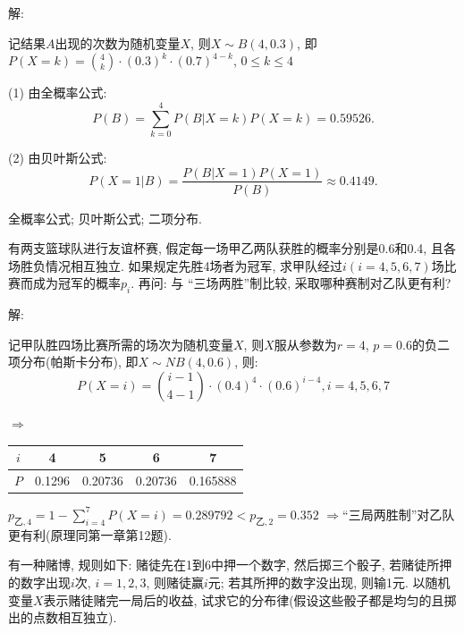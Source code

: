 \documentclass[standard]{ExBook}
\begin{document}
\begin{qitems}
    \begin{bbox}
解: 

记结果$A$出现的次数为随机变量$X$, 则$X\sim B(4,0.3)$, 即$P(X=k)=\binom{4}{k}\cdot(0.3)^k\cdot(0.7)^{4-k}$, $0 \leq k \leq 4$

(1) 由全概率公式:
$$P(B)=\sum\limits_{k=0}^{4}P(B|X=k)P(X=k)=0.59526.$$

(2) 由贝叶斯公式:
$$P(X=1|B)=\frac{P(B|X=1)P(X=1)}{P(B)}\approx0.4149.$$

\textcolor{themeColor}{\selectfont {} 全概率公式; 贝叶斯公式; 二项分布.}
    \end{bbox}

\vspace{-5em}

    \begin{bbox}
    \begin{shaded}
        \qitem
有两支篮球队进行友谊杯赛, 假定每一场甲乙两队获胜的概率分别是0.6和0.4, 且各场胜负情况相互独立. 如果规定先胜4场者为冠军, 求甲队经过$i(i=4,5,6,7)$场比赛而成为冠军的概率$p_{i}$. 再问: 与 ``三场两胜''制比较, 采取哪种赛制对乙队更有利?
    \end{shaded}
    \end{bbox}

\vspace{-5em}

    \begin{bbox}
解: 

记甲队胜四场比赛所需的场次为随机变量$X$, 则$X$服从参数为$r=4$, $p=0.6$的负二项分布(帕斯卡分布), 即$X\sim NB(4,0.6)$, 则:
$$P(X=i)=\binom{i-1}{4-1}\cdot(0.4)^{4}\cdot(0.6)^{i-4},i=4,5,6,7$$
\begin{center}
    $\Longrightarrow$
\begin{tabular}{c|c|c|c|c}
    \hline
    $i$ & 4 & 5 & 6 & 7 \\
    \hline
    $P$ & 0.1296 & 0.20736 & 0.20736 & 0.165888\\
    \hline
\end{tabular}
\end{center}
$p_{\text{乙},4}=1-\sum\limits_{i=4}^{7}P(X=i)=0.289792 < p_{\text{乙},2}=0.352$ $\Longrightarrow$``三局两胜制''对乙队更有利(原理同第一章第12题).
    \end{bbox}

\vspace{-5em}

    \begin{bbox}
    \begin{shaded}
        \qitem
有一种赌博, 规则如下: 赌徒先在1到6中押一个数字, 然后掷三个骰子, 若赌徒所押的数字出现$i$次, $i=1,2,3$, 则赌徒赢$i$元; 若其所押的数字没出现, 则输1元. 以随机变量$X$表示赌徒赌完一局后的收益, 试求它的分布律(假设这些骰子都是均匀的且掷出的点数相互独立).
    \end{shaded}
    \end{bbox}


\end{qitems}
\end{document}
